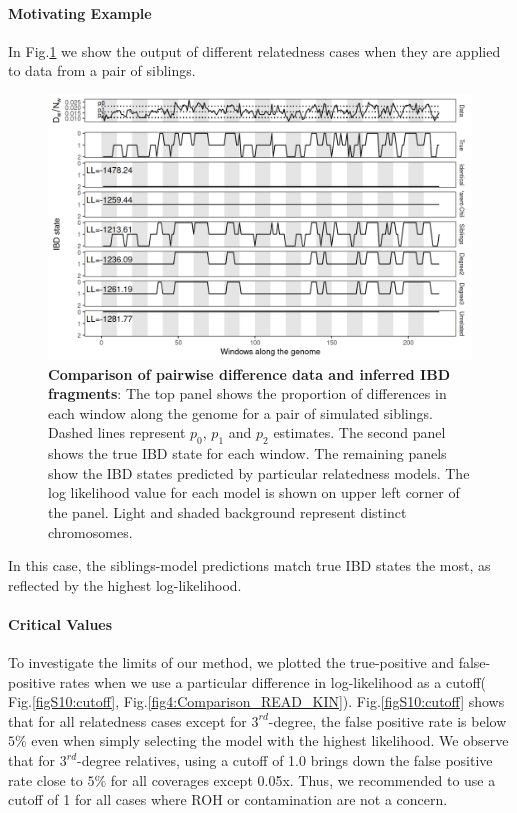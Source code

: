 \documentclass[12pt, letterpaper]{article}
\begin{document}
\paragraph{Motivating Example}
In Fig.\ref{fig1:ibd} we show the output of different relatedness cases when they are applied to data from a pair of siblings.

\begin{figure}[h!]
    \includegraphics[width=16cm]{plots/plotimg/IBDplot.png}
    \centering
    \caption{\textbf{Comparison of pairwise difference data  and inferred IBD fragments}:  The top panel shows the proportion of differences in each window along the genome for a pair of simulated siblings. Dashed lines represent $p_0$, $p_1$ and $p_2$ estimates. The second panel shows the true IBD state for each window. The remaining panels show the IBD states predicted by particular relatedness models. The log likelihood value for each model is shown on upper left corner of the panel. Light and shaded background represent distinct chromosomes.}
    \label{fig1:ibd}
\end{figure}

In this case, the siblings-model predictions match true IBD states the most, as reflected by the highest log-likelihood. 


\paragraph{Critical Values}
 To investigate the limits of our method, we plotted the true-positive and false-positive rates when we use a particular difference in log-likelihood as a cutoff( Fig.\ref{figS10:cutoff},  Fig.\ref{fig4:Comparison_READ_KIN}).   Fig.\ref{figS10:cutoff} shows that for all relatedness cases except for $3^{rd}$-degree, the false positive rate is below $5\%$ even when simply selecting the model with the highest likelihood. We observe that for $3^{rd}$-degree relatives, using a cutoff of 1.0 brings down the false positive rate close to $5\%$ for all coverages except 0.05x. Thus, we  recommended to use a cutoff of 1 for all cases where ROH or contamination are not a concern.
\end{document}

